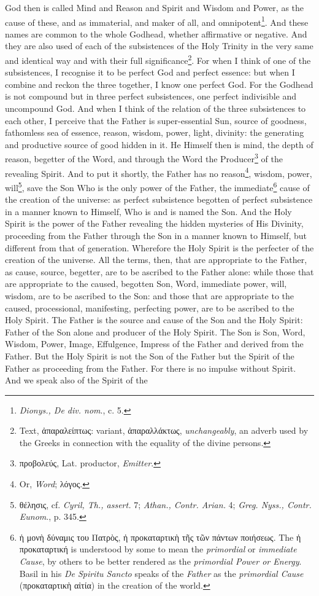 God then is called Mind and Reason and Spirit and Wisdom and Power, as the cause of these, and as immaterial, and maker of all, and omnipotent\footnote{\emph{Dionys., De div. nom}., c. 5.}. And these names are common to the whole Godhead, whether affirmative or negative. And they are also used of each of the subsistences of the Holy Trinity in the very same and identical way and with their full significance\footnote{Text, \textgreek{ἀπαραλείπτως}: variant, \textgreek{ἀπαραλλάκτως}, \emph{unchangeably}, an adverb used by the Greeks in connection with the equality of the divine persons.}. For when I think of one of the subsistences, I recognise it to be perfect God and perfect essence: but when I combine and reckon the three together, I know one perfect God. For the Godhead is not compound but in three perfect subsistences, one perfect indivisible and uncompound God. And when I think of the relation of the three subsistences to each other, I perceive that the Father is super-essential Sun, source of goodness, fathomless sea of essence, reason, wisdom, power, light, divinity: the generating and productive source of good hidden in it. He Himself then is mind, the depth of reason, begetter of the Word, and through the Word the Producer\footnote{\textgreek{προβολεύς}, Lat. productor, \emph{Emitter}.} of the revealing Spirit. And to put it shortly, the Father has no reason\footnote{Or, \emph{Word}; \textgreek{λόγος}.}, wisdom, power, will\footnote{\textgreek{θέλησις}, cf. \emph{Cyril, Th., assert. }7; \emph{Athan., Contr. Arian. }4; \emph{Greg. Nyss., Contr. Eunom}., p. 345.}, save the Son Who is the only power of the Father, the immediate\footnote{\textgreek{ἡ μονὴ δύναμις του Πατρὸς, ἠ προκαταρτικὴ τῆς τῶν πάντων ποιήσεως}. The \textgreek{ἡ προκαταρτική} is understood by some to mean the \emph{primordial }or \emph{immediate Cause}, by others to be better rendered as the \emph{primordial Power or Energy}. Basil in his \emph{De Spiritu Sancto }speaks of the \emph{Father }as the \emph{primordial Cause} (\textgreek{προκαταρτικὴ αἰτία}) in the creation of the world.} cause of the creation of the universe: as perfect subsistence begotten of perfect subsistence in a manner known to Himself, Who is and is named the Son. And the Holy Spirit is the power of the Father revealing the hidden mysteries of His Divinity, proceeding from the Father through the Son in a manner known to Himself, but different from that of generation. Wherefore the Holy Spirit is the perfecter of the creation of the universe. All the terms, then, that are appropriate to the Father, as cause, source, begetter, are to be ascribed to the Father alone: while those that are appropriate to the caused, begotten Son, Word, immediate power, will, wisdom, are to be ascribed to the Son: and those that are appropriate to the caused, processional, manifesting, perfecting power, are to be ascribed to the Holy Spirit. The Father is the source and cause of the Son and the Holy Spirit: Father of the Son alone and producer of the Holy Spirit. The Son is Son, Word, Wisdom, Power, Image, Effulgence, Impress of the Father and derived from the Father. But the Holy Spirit is not the Son of the Father but the Spirit of the Father as proceeding from the Father. For there is no impulse without Spirit. And we speak also of the Spirit of the 